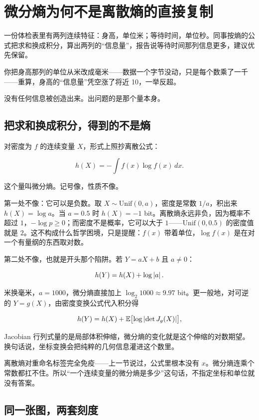 \section{微分熵为何不是离散熵的直接复制}
\label{sec:07-Information-Theory/01-Information-and-Entropy/03}

一份体检表里有两列连续特征：身高，单位米；等待时间，单位秒。同事按熵的公式把求和换成积分，算出两列的``信息量''，报告说等待时间那列信息更多，建议优先保留。

你把身高那列的单位从米改成毫米——数据一个字节没动，只是每个数乘了一千——重算，身高的``信息量''凭空涨了将近 10，一举反超。

没有任何信息被创造出来。出问题的是那个量本身。

\subsection{把求和换成积分，得到的不是熵}

对密度为 \(f\) 的连续变量 \(X\)，形式上照抄离散公式：

\[
h(X)=-\int f(x)\log f(x)\,dx.
\]

这个量叫微分熵。记号像，性质不像。

第一处不像：它可以是负数。取 \(X\sim\mathrm{Unif}(0,a)\)，密度是常数 \(1/a\)，积出来 \(h(X)=\log a\)。当 \(a=0.5\) 时 \(h(X)=-1\) bit。离散熵永远非负，因为概率不超过 \(1\)，\(-\log p\ge0\)；而密度不是概率，它可以大于 \(1\)——\(\mathrm{Unif}(0,0.5)\) 的密度值就是 \(2\)。这不构成什么哲学困境，只是提醒：\(f(x)\) 带着单位，\(\log f(x)\) 是在对一个有量纲的东西取对数。

第二处不像，也就是开头那个陷阱。若 \(Y=aX+b\) 且 \(a\ne0\)：

\[
h(Y)=h(X)+\log\left|a\right|.
\]

米换毫米，\(a=1000\)，微分熵直接加上 \(\log_2 1000\approx 9.97\) bit。更一般地，对可逆的 \(Y=g(X)\)，由密度变换公式代入积分得

\[
h(Y)=h(X)+\mathbb{E}\bigl[\log\left|\det J_g(X)\right|\bigr],
\]

Jacobian 行列式量的是局部体积伸缩，微分熵的变化就是这个伸缩的对数期望。换句话说，坐标变换会把纯粹的几何信息灌进这个数里。

离散熵对重命名标签完全免疫——上一节说过，公式里根本没有 \(x\)。微分熵连乘个常数都扛不住。所以``一个连续变量的微分熵是多少''这句话，不指定坐标和单位就没有答案。

\subsection{同一张图，两套刻度}

